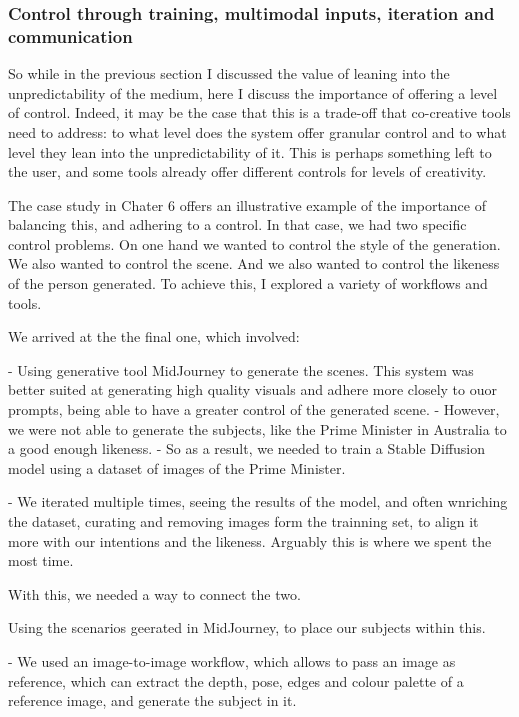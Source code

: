 \subsubsection{Control through training, multimodal inputs, iteration and communication}


So while in the previous section I discussed the value of leaning into the unpredictability of the medium, here I discuss the importance of offering a level of control. Indeed, it may be the case that this is a trade-off that co-creative tools need to address: to what level does the system offer granular control and to what level they lean into the unpredictability of it. This is perhaps something left to the user, and some tools already offer different controls for levels of creativity. 

The case study in Chater 6 offers an illustrative example of the importance of balancing this, and adhering to a control. In that case, we had two specific control problems. On one hand we wanted to control the style of the generation. We also wanted to control the scene. And we also wanted to control the likeness of the person generated. To achieve this, I explored a variety of workflows and tools. 

We arrived at the the final one, which involved: 

- Using generative tool MidJourney to generate the scenes. This system was better suited at generating high quality visuals and adhere more closely to ouor prompts, being able to have a greater control of the generated scene. 
- However, we were not able to generate the subjects, like the Prime Minister in Australia to a good enough likeness. 
- So as a result, we needed to train a Stable Diffusion model using a dataset of images of the Prime Minister. 

- We iterated multiple times, seeing the results of the model, and often wnriching the dataset, curating and removing images form the trainning set, to align it more with our intentions and the likeness. Arguably this is where we spent the most time. 

With this, we needed a way to connect the two. 

Using the scenarios geerated in MidJourney, to place our subjects within this. 

- We used an image-to-image workflow, which allows to pass an image as reference, which can extract the depth, pose, edges and colour palette of a reference image, and generate the subject in it. 

